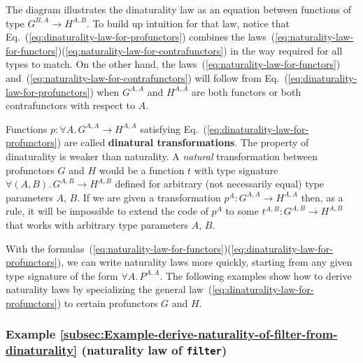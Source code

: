 \noindent The diagram illustrates the dinaturality law as an equation
between functions of type $G^{B,A}\rightarrow H^{A,B}$. To build
up intuition for that law, notice that Eq.~(\ref{eq:dinaturality-law-for-profunctors})
combines the laws~(\ref{eq:naturality-law-for-functors})\textendash (\ref{eq:naturality-law-for-contrafunctors})
in the way required for all types to match. On the other hand, the
laws~(\ref{eq:naturality-law-for-functors}) and~(\ref{eq:naturality-law-for-contrafunctors})
will follow from Eq.~(\ref{eq:dinaturality-law-for-profunctors})
when $G^{A,A}$ and $H^{A,A}$ are both functors or both contrafunctors
with respect to $A$.

Functions $p:\forall A.\,G^{A,A}\rightarrow H^{A,A}$ satisfying Eq.~(\ref{eq:dinaturality-law-for-profunctors})
are called \textbf{dinatural transformations}.
The property of dinaturality is weaker than naturality.\emph{ }A \emph{natural}
transformation between profunctors $G$ and $H$ would be a function
$t$ with type signature $\forall(A,B).\,G^{A,B}\rightarrow H^{A,B}$
defined for arbitrary (not necessarily equal) type parameters $A$,
$B$. If we are given a transformation $p^{A}:G^{A,A}\rightarrow H^{A,A}$
then, as a rule, it will be impossible to extend the code of $p^{A}$
to some $t^{A,B}:G^{A,B}\rightarrow H^{A,B}$ that works with arbitrary
type parameters $A$, $B$.

With the formulas~(\ref{eq:naturality-law-for-functors})\textendash (\ref{eq:dinaturality-law-for-profunctors}),
we can write naturality laws more quickly, starting from any given
type signature of the form $\forall A.\,P^{A,A}$. The following examples
show how to derive naturality laws by specializing the general law~(\ref{eq:dinaturality-law-for-profunctors})
to certain profunctors $G$ and $H$.

\subsubsection{Example \label{subsec:Example-derive-naturality-of-filter-from-dinaturality}\ref{subsec:Example-derive-naturality-of-filter-from-dinaturality}
(naturality law of \lstinline!filter!)}

